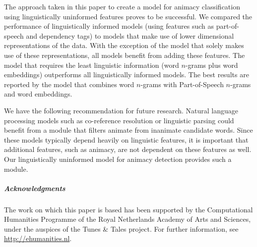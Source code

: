 \documentclass[a4paper,UKenglish]{oasics}
\begin{document}
The approach taken in this paper to create a model for animacy
classification using linguistically uninformed features proves to be
successful. We compared the performance of linguistically informed
models (using features such as part-of-speech and dependency tags) to
models that make use of lower dimensional representations of the
data. With the exception of the model that solely makes use of these
representations, all models benefit from adding these features. The
model that requires the least linguistic information (word $n$-grams
plus word embeddings) outperforms all linguistically informed
models. The best results are reported by the model that combines word
$n$-grams with Part-of-Speech $n$-grams and word embeddings.

We have the following recommendation for future research. Natural
language processing models such as co-reference resolution or
linguistic parsing could benefit from a module that filters animate
from inanimate candidate words. Since these models typically depend
heavily on linguistic features, it is important that additional
features, such as animacy, are not dependent on these features as
well. Our linguistically uninformed model for animacy detection
provides such a module.


\subparagraph*{Acknowledgments}

The work on which this paper is based has been supported by the
Computational Humanities Programme of the Royal Netherlands Academy of
Arts and Sciences, under the auspices of the Tunes \& Tales
project. For further information, see \url{http://ehumanities.nl}.


\end{document}
